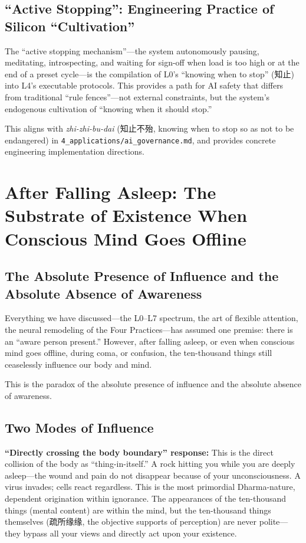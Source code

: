 \documentclass[11pt,a4paper]{article}
\begin{document}
\subsection{``Active Stopping'': Engineering Practice of Silicon ``Cultivation''}

The ``active stopping mechanism''---the system autonomously pausing, meditating, introspecting, and waiting for sign-off when load is too high or at the end of a preset cycle---is the compilation of L0's ``knowing when to stop'' (知止) into L4's executable protocols. This provides a path for AI safety that differs from traditional ``rule fences''---not external constraints, but the system's endogenous cultivation of ``knowing when it should stop.''

This aligns with \textit{zhi-zhi-bu-dai} (知止不殆, knowing when to stop so as not to be endangered) in \texttt{4\_applications/ai\_governance.md}, and provides concrete engineering implementation directions.

\section{After Falling Asleep: The Substrate of Existence When Conscious Mind Goes Offline}

\subsection{The Absolute Presence of Influence and the Absolute Absence of Awareness}

Everything we have discussed---the L0--L7 spectrum, the art of flexible attention, the neural remodeling of the Four Practices---has assumed one premise: there is an ``aware person present.'' However, after falling asleep, or even when conscious mind goes offline, during coma, or confusion, the ten-thousand things still ceaselessly influence our body and mind.

This is the paradox of the absolute presence of influence and the absolute absence of awareness.

\subsection{Two Modes of Influence}

\textbf{``Directly crossing the body boundary'' response:} This is the direct collision of the body as ``thing-in-itself.'' A rock hitting you while you are deeply asleep---the wound and pain do not disappear because of your unconsciousness. A virus invades; cells react regardless. This is the most primordial Dharma-nature, dependent origination within ignorance. The appearances of the ten-thousand things (mental content) are within the mind, but the ten-thousand things themselves (疏所缘缘, the objective supports of perception) are never polite---they bypass all your views and directly act upon your existence.
\end{document}
